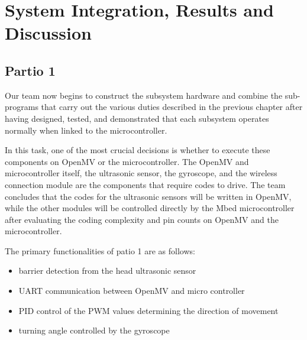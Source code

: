 \documentclass[12pt, a4paper, oneside]{report}
\begin{document}
	

\chapter{System Integration, Results and Discussion}
\section{Partio 1}
Our team now begins to construct the subsystem hardware and combine the sub-programs that carry out the various duties described in the previous chapter after having designed, tested, and demonstrated that each subsystem operates normally when linked to the microcontroller.

In this task, one of the most crucial decisions is whether to execute these components on OpenMV or the microcontroller. The OpenMV and microcontroller itself, the ultrasonic sensor, the gyroscope, and the wireless connection module are the components that require codes to drive. The team concludes that the codes for the ultrasonic sensors will be written in OpenMV, while the other modules will be controlled directly by the Mbed microcontroller after evaluating the coding complexity and pin counts on OpenMV and the microcontroller.

The primary functionalities of patio 1 are as follows:

\begin{itemize}
    \item barrier detection from the head ultrasonic sensor
    \item UART communication between OpenMV and micro controller
    \item PID control of the PWM values determining the direction of movement
    \item turning angle controlled by the gyroscope
\end{itemize}
\end{document}
